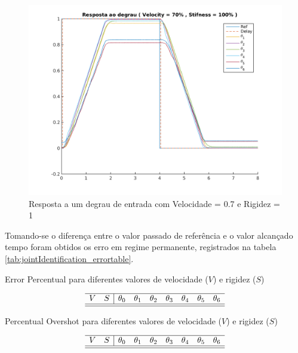 \begin{figure}[H]
    \centering
    \includegraphics[width=0.8\linewidth]{tex/figs/jointIdentification_exp3v70v100.png}
    \caption{Resposta a um degrau de entrada com Velocidade = 0.7 e Rigidez = 1}
    \label{fig:jointIdentification_exp3v70v100}
\end{figure}


Tomando-se o diferença entre o valor passado de referência e o valor alcançado tempo foram obtidos os erro em regime permanente, registrados na tabela \ref{tab:jointIdentification_errortable}.

\begin{table}[H]
    \centering
    \caption{Error Percentual para diferentes valores de velocidade ($V$) e rigidez ($S$)}
    $$\begin{array}{cc|ccccccc}
         \hline
         V & S & \theta_0 & \theta_1 & \theta_2 & \theta_3 & \theta_4 & \theta_5 & \theta_6\\
         \hline
         
         \hline
    \end{array}$$
    \label{tab:jointIdentification_errortable}
\end{table}

\begin{table}[H]
    \centering
    \caption{Percentual Overshot para diferentes valores de velocidade ($V$) e rigidez ($S$)}
    $$\begin{array}{cc|ccccccc}
         \hline
         V & S & \theta_0 & \theta_1 & \theta_2 & \theta_3 & \theta_4 & \theta_5 & \theta_6\\
         \hline
         
         \hline
    \end{array}$$
    \label{tab:jointIdentification_overshottable}
\end{table}

